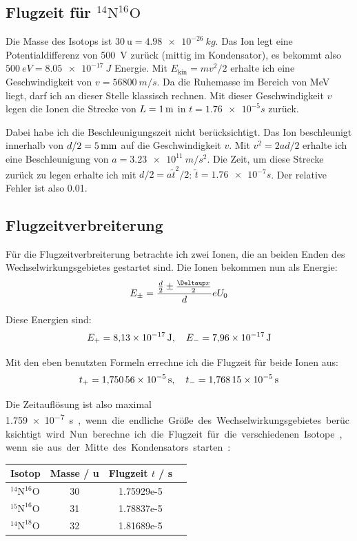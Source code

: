 \subsection{Flugzeit für $\mathrm{^{14}N^{16}O}$}

Die Masse des Isotops ist $\SI{30}{\atomicmassunit} = \SI{4.98e-26}{kg}$. Das
Ion legt eine Potentialdifferenz von \SI{500}{V} zurück (mittig im
Kondensator), es bekommt also $\SI{500}{eV} = \SI{8.05e-17}{J}$ Energie. Mit
$E_\text{kin} = mv^2/2$ erhalte ich eine Geschwindigkeit von $v =
\SI{56800}{m/s}$. Da die Ruhemasse im Bereich von \si{MeV} liegt, darf ich an
dieser Stelle klassisch rechnen. Mit dieser Geschwindigkeit $v$ legen die Ionen
die Strecke von $L = \SI1m$ in $t = \SI{1.76e-5}s$ zurück.

Dabei habe ich die Beschleunigungszeit nicht berücksichtigt. Das Ion
beschleunigt innerhalb von $d/2 = \SI5{mm}$ auf die Geschwindigkeit $v$. Mit
$v^2 = 2ad/2$ erhalte ich eine Beschleunigung von $a = \SI{3.23e11}{m/s^2}$.
Die Zeit, um diese Strecke zurück zu legen erhalte ich mit $d/2 = a \tilde
t^2/2$: $\tilde t = \SI{1.76e-7}s$. Der relative Fehler ist also \num{0.01}.

\subsection{Flugzeitverbreiterung}

Für die Flugzeitverbreiterung betrachte ich zwei Ionen, die an beiden Enden des
Wechselwirkungsgebietes gestartet sind. Die Ionen bekommen nun als Energie:
\[
	E_\pm = \frac{\frac d2 \pm \frac{\Deltaup x}2}d e U_0
\]

Diese Energien sind:
\[
	E_+ = \SI{8.13e-17}J
	,\quad
	E_- = \SI{7.96e-17}J
\]

Mit den eben benutzten Formeln errechne ich die Flugzeit für beide Ionen aus:
\[
	t_+ = \SI{1.75056e-5}s
	,\quad
	t_- = \SI{1.76815e-5}s
\]

Die Zeitauflösung ist also maximal \SI{1.759e-7}s, wenn die endliche Größe des
Wechselwirkungsgebietes berücksichtigt wird. Nun berechne ich die Flugzeit für
die verschiedenen Isotope, wenn sie aus der Mitte des Kondensators starten:
\begin{center}
	\begin{tabular}{lSSS}
		Isotop & {Masse / \si{\atomicmassunit}} & {Flugzeit $t$ / \si s} \\
		\hline
		$\mathrm{^{14}N^{16}O}$ & 30 & 1.75929e-5 \\
		$\mathrm{^{15}N^{16}O}$ & 31 & 1.78837e-5 \\
		$\mathrm{^{14}N^{18}O}$ & 32 & 1.81689e-5 \\
	\end{tabular}
\end{center}

